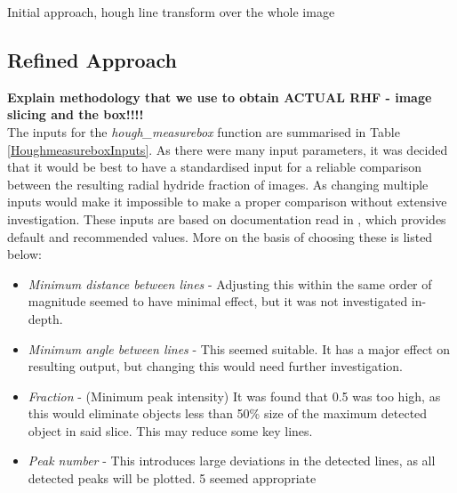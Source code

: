 \documentclass{article}
\begin{document}

Initial approach, hough line transform over the whole image


\subsection{Refined Approach}
\textbf{Explain methodology that we use to obtain ACTUAL RHF - image slicing and the box!!!!}\\

The inputs for the \textit{hough\_measurebox} function are summarised in Table \ref{HoughmeasureboxInputs}. As there were many input parameters, it was decided that it would be best to have a standardised input for a reliable comparison between the resulting radial hydride fraction of images. As changing multiple inputs would make it impossible to make a proper comparison without extensive investigation. These inputs are based on documentation read in \cite{ScikitimageB}, which provides default and recommended values. More on the basis of choosing these is listed below:

\begin{itemize}
    \item \textit{Minimum distance between lines} - Adjusting this within the same order of magnitude seemed to have minimal effect, but it was not investigated in-depth.

    \item \textit{Minimum angle between lines} - This seemed suitable. It has a major effect on resulting output, but changing this would need further investigation.

    \item \textit{Fraction} - (Minimum peak intensity) It was found that 0.5 was too high, as this would eliminate objects less than 50\% size of the maximum detected object in said slice. This may reduce some key lines.

    \item \textit{Peak number} - This introduces large deviations in the detected lines, as all detected peaks will be plotted. 5 seemed appropriate
\end{itemize}
\end{document}

